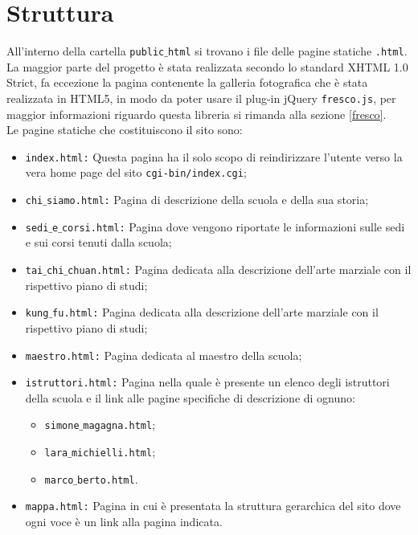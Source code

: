 \section{Struttura}
All'interno della cartella \texttt{public$\_$html} si trovano i file delle pagine statiche \texttt{.html}. \\
La maggior parte del progetto è stata realizzata secondo lo standard XHTML 1.0 Strict, fa eccezione la pagina contenente la galleria fotografica che è stata realizzata in HTML5, in modo da poter usare il plug-in jQuery \texttt{fresco.js}, per maggior informazioni riguardo questa libreria si rimanda alla sezione \ref{fresco}.\\
Le pagine statiche che costituiscono il sito sono:
\begin{itemize}
\item \texttt{index.html:} Questa pagina ha il solo scopo di reindirizzare l'utente verso la vera home page del sito \texttt{cgi-bin/index.cgi};

\item \texttt{chi$\_$siamo.html:} Pagina di descrizione della scuola e della sua storia;

\item \texttt{sedi$\_$e$\_$corsi.html:} Pagina dove vengono riportate le informazioni sulle sedi e sui corsi tenuti dalla scuola;
 
\item \texttt{tai$\_$chi$\_$chuan.html:} Pagina dedicata alla descrizione dell'arte marziale con il rispettivo piano di studi;

\item \texttt{kung$\_$fu.html:} Pagina dedicata alla descrizione dell'arte marziale con il rispettivo piano di studi;

\item \texttt{maestro.html:} Pagina dedicata al maestro della scuola;

\item \texttt{istruttori.html:} Pagina nella quale è presente un elenco degli istruttori della scuola e il link alle pagine specifiche di descrizione di ognuno:
    \begin{itemize}
    \item \texttt{simone$\_$magagna.html};
    \item \texttt{lara$\_$michielli.html};
    \item \texttt{marco$\_$berto.html}.
    \end{itemize}
					
\item \texttt{mappa.html:} Pagina in cui è presentata la struttura gerarchica del sito dove ogni voce è un link alla pagina indicata.

\end{itemize}
